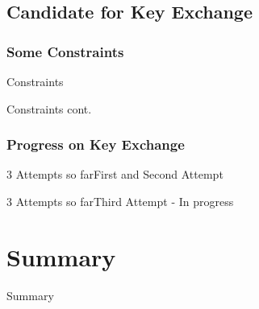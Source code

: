 \documentclass{beamer}
\begin{document}
    \subsection{Candidate for Key Exchange}
        \subsubsection{Some Constraints}


        \begin{frame}{Constraints}
                    
            
        \end{frame}
     

        \begin{frame}{Constraints cont.}
        
            

        \end{frame}
        
        \subsubsection{Progress on Key Exchange}
        

        \begin{frame}{3 Attempts so far}{First and Second Attempt}
            
        \end{frame}

        
        \begin{frame}{3 Attempts so far}{Third Attempt - In progress}
            
            
            
        \end{frame}
\section*{Summary}


\begin{frame}{Summary}
  


\end{frame}
\end{document}
